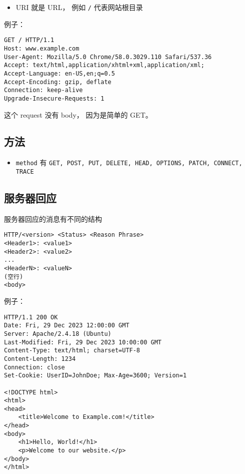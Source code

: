 \begin{itemize}
\item URI 就是 URL， 例如 \verb`/` 代表网站根目录
\end{itemize}

例子：
\begin{lstlisting}[language=none]
GET / HTTP/1.1
Host: www.example.com
User-Agent: Mozilla/5.0 Chrome/58.0.3029.110 Safari/537.36
Accept: text/html,application/xhtml+xml,application/xml;
Accept-Language: en-US,en;q=0.5
Accept-Encoding: gzip, deflate
Connection: keep-alive
Upgrade-Insecure-Requests: 1
\end{lstlisting}
这个 request 没有 body， 因为是简单的 GET。

\subsection{方法}
\begin{itemize}
\item \verb|method| 有 \verb|GET, POST, PUT, DELETE, HEAD, OPTIONS, PATCH, CONNECT, TRACE|
\end{itemize}


\subsection{服务器回应}
服务器回应的消息有不同的结构
\begin{lstlisting}[language=none]
HTTP/<version> <Status> <Reason Phrase>
<Header1>: <value1>
<Header2>: <value2>
...
<HeaderN>: <valueN>
(空行)
<body>
\end{lstlisting}

例子：
\begin{lstlisting}[language=none]
HTTP/1.1 200 OK
Date: Fri, 29 Dec 2023 12:00:00 GMT
Server: Apache/2.4.18 (Ubuntu)
Last-Modified: Fri, 29 Dec 2023 10:00:00 GMT
Content-Type: text/html; charset=UTF-8
Content-Length: 1234
Connection: close
Set-Cookie: UserID=JohnDoe; Max-Age=3600; Version=1

<!DOCTYPE html>
<html>
<head>
    <title>Welcome to Example.com!</title>
</head>
<body>
    <h1>Hello, World!</h1>
    <p>Welcome to our website.</p>
</body>
</html>
\end{lstlisting}


